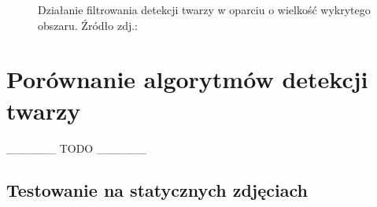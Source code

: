 \begin{itemize}
\begin{figure}[!h]
\begin{center}
        \end{center}
        \caption{Działanie filtrowania detekcji twarzy w oparciu o wielkość wykrytego obszaru. Źródło zdj.: \cite{readheadPortrait1}}
        \label{fig:face_size}
    \end{figure}
    
    
    
\end{itemize}


\section{Porównanie algorytmów detekcji twarzy}

\_\_\_\_\_\_ TODO \_\_\_\_\_\_ 

\subsection{Testowanie na statycznych zdjęciach}

